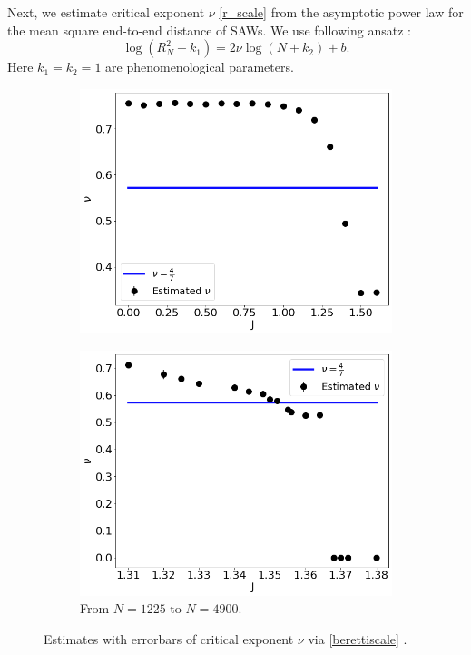 \label{structureprocedure}
Next, we estimate critical exponent $\nu$ \eqref{r_scale} from the asymptotic power law for the mean square end-to-end distance of SAWs. We use following ansatz  \cite{Berretti1985}:
\begin{equation}
\label{berettiscale}
\log (R_N^2+k_1 ) = 2 \nu \log (N+k_2) + b.
\end{equation}
Here $k_1=k_2=1$ are phenomenological parameters. 
 \begin{figure} 
 	\centering
 	\captionsetup{justification=centering}
\begin{subfigure}[b]{0.45\textwidth}
	\includegraphics[scale=0.36]{Images/nu_shortchains.png}
	\label{fig:nushort_left}
\end{subfigure}
	\begin{subfigure}[b]{0.45\textwidth}
	\includegraphics[scale=0.36]{Images/nu_shortchains_1.png}
		\caption{ From $N=1225$ to $N=4900$. }
	\label{fig:nushort_right}
\end{subfigure}
	\caption{  Estimates with errorbars of critical exponent $\nu$ via \eqref{berettiscale} .   }
	\label{fig:nushort}
\end{figure}
 

